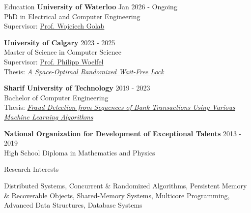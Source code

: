 \documentclass{resume} %
\begin{document}

\begin{rSection}{Education}
{\bf University of Waterloo} \hfill {Jan 2026 - Ongoing} 
\\ PhD in Electrical and Computer Engineering
\\ Supervisor: \href{https://uwaterloo.ca/distributed-algorithms-systems-lab/}{Prof. Wojciech Golab}

{\bf University of Calgary} \hfill { 2023 - 2025} 
\\ Master of Science in Computer Science
\\ Supervisor: \href{https://www.woelfellab.org/about.html}{Prof. Philipp Woelfel}
\\ Thesis: \textit{\href{https://ucalgary.scholaris.ca/bitstreams/5ae5cf8f-5009-4db3-b91e-d3dbb679b5bf/download}{A Space-Optimal Randomized Wait-Free Lock}}


{\bf Sharif University of Technology} \hfill { 2019 - 2023} 
\\ Bachelor of Computer Engineering
\\ Thesis: \href{https://github.com/kahbodaeini/Fraud-Detection}{\textit{Fraud Detection from Sequences of Bank Transactions Using Various Machine Learning Algorithms}}


{\bf National Organization for Development of Exceptional Talents } \hfill { 2013 - 2019}
\\ High School Diploma in Mathematics and
Physics
\end{rSection}


\begin{rSection}{Research Interests}

Distributed Systems, Concurrent \& Randomized Algorithms, Persistent Memory \& Recoverable Objects,
Shared-Memory Systems, Multicore Programming, Advanced Data Structures, Database Systems
\end{rSection}
\end{document}
